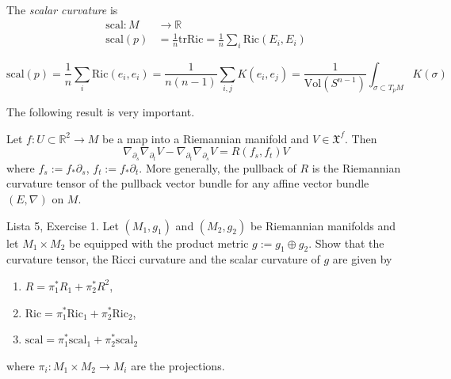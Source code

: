The {\it scalar curvature} is
\begin{equation}
\label{equation-scalar-curvature}
\begin{aligned}
\text{scal}: M &\longrightarrow \mathbb{R} \\
\text{scal}(p)&=\frac{1}{n}\text{tr}
\text{Ric}
=\frac{1}{n}\sum_i\text{Ric}(E_i,E_i)
\end{aligned}
\end{equation}

\begin{lemma}
\label{lemma-scala-curva-mean-secti}
$$
\text{scal}(p)=\frac{1}{n}\sum_{i}\text{Ric}
(e_i,e_i)
=\frac{1}{n(n-1)}\sum_{i,j}K(e_i,e_j)
=\frac{1}{\text{Vol}(S^{n-1})}
\int_{\sigma\subset
T_pM}K(\sigma)
$$
\end{lemma}

\medskip\noindent
The following result is very important.

\begin{lemma}
\label{lemma-symmetry-lemma-curvature}
Let $f:U \subset \mathbb{R}^2 \to M$
be a map into a Riemannian manifold and $V
\in \mathfrak{X}^f$.
Then
$$
\nabla_{\partial_s}\nabla_{\partial_t}V
-\nabla_{\partial_t}\nabla_{\partial_s}V
=R(f_s,f_t)V
$$
where $f_s:=f_*\partial_s$,
$f_t:=f_*\partial_t$.
More generally, the pullback of $R$ is the
Riemannian curvature tensor of the pullback
vector bundle
for any affine vector bundle $(E,\nabla)$ on
$M$.
\end{lemma}


\begin{exercise}
\label{lemma-curvatures-of-product-metric}
Lista 5, Exercise 1. Let $(M_1,g_1)$ and
$(M_2,g_2)$ be Riemannian manifolds and
let $M_1\times M_2$ be equipped with the
product metric $g:=g_1\oplus g_2$. Show
that the curvature tensor, the Ricci
curvature and the scalar curvature of $g$
are given by
\begin{enumerate}
\item $R=\pi_1^*R_1+\pi_2^*R^2$,
\item
$\text{Ric}=\pi_1^*\text{Ric}_1+
\pi_2^*\text{Ric}_2$,
\item
$\text{scal}=\pi_1^*\text{scal}_1+
\pi_2^*\text{scal}_2$
\end{enumerate}
where $\pi_i:M_1\times M_2\to M_i$ are the
projections.
\end{exercise}


